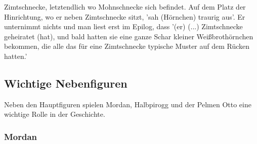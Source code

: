 {Zimtschnecke, letztendlich wo Mohnschnecke sich befindet.\cite[S.599]{pir} Auf dem Platz der Hinrichtung, wo er neben Zimtschnecke sitzt, \cite[S.609]{pir} 'sah (Hörnchen) traurig aus'.\cite[S.609]{pir} Er unternimmt nichts und man liest erst im Epilog, dass '(er) (...) Zimtschnecke geheiratet (hat), und bald hatten sie eine ganze Schar kleiner Weißbrothörnchen bekommen, die alle das für eine Zimtschnecke typische Muster auf dem Rücken hatten.'\cite[S.644]{pir}

\subsection{Wichtige Nebenfiguren}
Neben den Hauptfiguren spielen Mordan, Halbpirogg und der Pelmen Otto eine wichtige Rolle in der Geschichte.

\subsubsection{Mordan}
}

